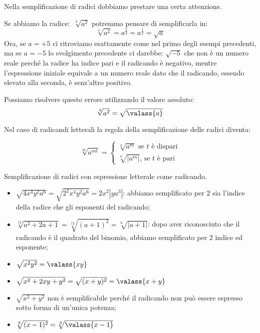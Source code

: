 Nella semplificazione di radici dobbiamo prestare una certa attenzione.
\begin{esempio}{}{}
Se abbiamo la radice:~\(\sqrt[4]{a^2}\) potremmo pensare di semplificarla 
in:
% 
\[\sqrt[4]{a^2}=a^{\frac{2}{4}}=a^{\frac{1}{2}}=\sqrt{a}\]
Ora, se \(a=+5\) ci ritroviamo esattamente come nel primo degli esempi 
precedenti, ma se \(a=-5\) lo svolgimento precedente ci darebbe: 
\(\sqrt {-5}\) 
che non è un numero reale perché la radice ha indice pari e il radicando 
è negativo, mentre l'espressione iniziale equivale a un numero reale dato 
che il radicando, essendo elevato alla seconda, è senz'altro positivo.

Possiamo risolvere questo errore utilizzando il valore assoluto:
% 
\[\sqrt[4]{a^2}=\sqrt{\valass{a}}\]
\end{esempio}

Nel caso di radicandi letterali la regola della semplificazione delle 
radici diventa:

\begin{teorema}{}{}
\[\sqrt[nt]{a^{mt}}=\left\{\begin{array}{l}
  \sqrt[n]{a^m} \text{ se }t \text{ è dispari}\\
  \sqrt[n]{\left|a^m\right|}\text{, se }t\text{ è pari}
\end{array}\right.\]
\end{teorema}

% 
\begin{esempio}{}{}
Semplificazione di radici con espressione letterale come radicando.
\begin{itemize} [left=0mm]
\item 
\(\sqrt{4x^4y^2a^6}=\sqrt{2^2x^4y^2a^6}=2x^2\left|ya^3\right|\): 
abbiamo semplificato per \(2\) sia l'indice della radice che gli 
esponenti del radicando;
\item 
\(\sqrt[12]{a^2+2a+1}=\sqrt[12]{(a+1)^2}=\sqrt[6]{\left|a+1\right|}\): 
dopo aver riconosciuto che il radicando è il quadrato del binomio, 
abbiamo semplificato per \(2\) indice ed esponente;
\item 
\(\sqrt{x^2y^2}=\valass{xy}\)
\item 
\(\sqrt{x^2+2xy+y^2}=\sqrt{(x+y)^2}=\valass{x+y}\)
\item 
\(\sqrt{x^2+y^2}\) non è semplificabile perché il radicando non può 
essere espresso sotto forma di un'unica potenza;
\item \(\sqrt[6]{(x-1)^2}=\sqrt[3]{\valass{x-1}}\)
\end{itemize}
\end{esempio}
% 

